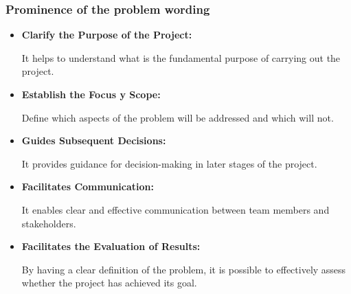 \documentclass{article}
\begin{document}
\subsubsection{Prominence of the problem wording}
\begin{itemize}
	\item
	      \textbf{Clarify the Purpose of the Project:}
	      \par It helps to understand what is the fundamental purpose of carrying
	      out the project.
	\item
	      \textbf{Establish the Focus y Scope:}
	      \par Define which aspects of the problem will be addressed and which
	      will not.
	\item
	      \textbf{Guides Subsequent Decisions:}
	      \par It provides guidance for decision-making in later stages of the
	      project.
	\item
	      \textbf{Facilitates Communication:}
	      \par It enables clear and effective communication between team members
	      and stakeholders.
	\item
	      \textbf{Facilitates the Evaluation of Results:}
	      \par By having a clear definition of the problem, it is possible to
	      effectively assess whether the project has achieved its goal.
\end{itemize}
\end{document}
